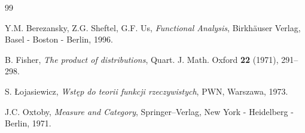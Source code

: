 \def\bibname{\centerline{{\LARGE{LITERATURA}}}}

\begin {thebibliography}{99}



Y.M. Berezansky, Z.G. Sheftel, G.F. Us, {\it Functional Analysis},
Birkh{\"a}user Verlag, Basel - Boston - Berlin, 1996.

B. Fisher, {\it The product of distributions}, Quart. J. Math. Oxford {\bf
22} (1971), 291--298.

S. Łojasiewicz, {\it Wstęp do teorii funkcji rzeczywistych}, PWN, Warszawa,
1973.

J.C. Oxtoby, {\it Measure and Category}, Springer--Verlag, New York -
Heidelberg - Berlin, 1971.

\end{thebibliography}